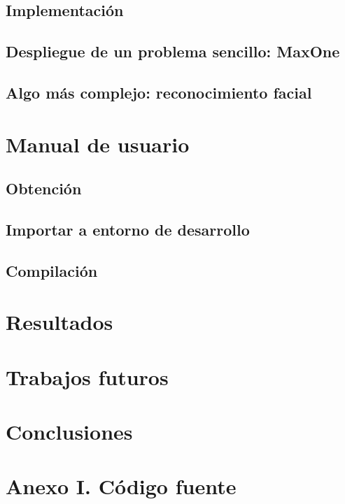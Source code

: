 \documentclass{estilos-y-libreria}
\begin{document}
	\section{Implementaci\'on}
		
	\section{Despliegue de un problema sencillo: MaxOne}
		
	\section{Algo m\'as complejo: reconocimiento facial}
		

\chapter{Manual de usuario}
	\section{Obtenci\'on}
		
	\section{Importar a entorno de desarrollo}
		
	\section{Compilaci\'on}
		

\chapter{Resultados}
	\label{resultados-maxone}
	\label{resultados-facerecognition}

\chapter{Trabajos futuros}

\chapter{Conclusiones}

\chapter{Anexo I. C\'odigo fuente}

\end{document}
